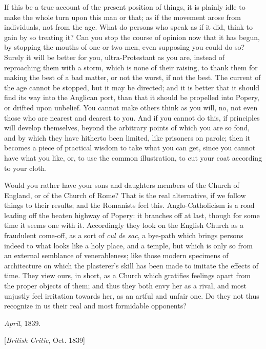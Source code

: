 If this be a true account of the present position
of things, it is plainly idle to make the whole turn upon this man or
that; as if the movement arose from individuals, not from the age.
What do persons who speak as if it did, think to gain by so treating
it? Can you stop the course of opinion now that it has begun, by
stopping the mouths of one or two men, even supposing you could do so?
Surely it will be better for you, ultra-Protestant as you are, instead
of reproaching them with a storm, which is none of their raising, to
thank them for making the best of a bad matter, or not the
worst, if not the best. The current of the age cannot be stopped, but
it may be directed; and it is better that it should find its way into
the Anglican port, than that it should be propelled into Popery, or
drifted upon unbelief. You cannot make others think as you will, no,
not even those who are nearest and dearest to you. And if you cannot
do this, if principles will develop themselves, beyond the arbitrary
points of which you are so fond, and by which they have hitherto been
limited, like prisoners on parole; then it becomes a piece of
practical wisdom to take what you can get, since you cannot have what
you like, or, to use the common illustration, to cut your coat
according to your cloth.

Would you rather have your sons and daughters
members of the Church of England, or of the Church of Rome? That is
the real alternative, if we follow things to their results; and the
Romanists feel this. Anglo-Catholicism is a road leading off the
beaten highway of Popery: it branches off at last, though for some
time it seems one with it. Accordingly they look on the English Church
as a fraudulent come-off, as a sort of \emph{cul de sac}, a bye-path
which brings persons indeed to what looks like a holy place, and a
temple, but which is only so from an external semblance of
venerableness; like those modern specimens of architecture on which
the plasterer's skill has been made to imitate the effects of time.
They view ours, in short, as a Church which gratifies feelings apart
from the proper objects of them; and thus they both envy her as a
rival, and most unjustly feel irritation towards her, as an artful and
unfair one. Do they not thus recognize in us their real and most
formidable opponents?

\emph{April}, 1839.


[\emph{British Critic}, Oct. 1839]

